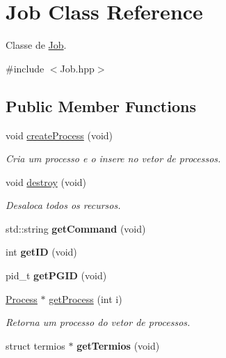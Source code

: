 \hypertarget{classJob}{
\section{Job Class Reference}
\label{classJob}
}


Classe de \hyperlink{classJob}{Job}.  




{\ttfamily \#include $<$Job.hpp$>$}

\subsection*{Public Member Functions}
\begin{DoxyCompactItemize}
\item 
\hypertarget{classJob_a5c8a3cd7594bc9d733b2cc96aa1d3048}{
void \hyperlink{classJob_a5c8a3cd7594bc9d733b2cc96aa1d3048}{createProcess} (void)}
\label{classJob_a5c8a3cd7594bc9d733b2cc96aa1d3048}

\begin{DoxyCompactList}\small\item\em Cria um processo e o insere no vetor de processos. \end{DoxyCompactList}\item 
\hypertarget{classJob_a2db562106fecee581006e4f955170d48}{
void \hyperlink{classJob_a2db562106fecee581006e4f955170d48}{destroy} (void)}
\label{classJob_a2db562106fecee581006e4f955170d48}

\begin{DoxyCompactList}\small\item\em Desaloca todos os recursos. \end{DoxyCompactList}\item 
\hypertarget{classJob_a4d30963a5021100ed0e42999b84d4975}{
std::string {\bfseries getCommand} (void)}
\label{classJob_a4d30963a5021100ed0e42999b84d4975}

\item 
\hypertarget{classJob_a240a158e548e4d5b5801088a9b762aa8}{
int {\bfseries getID} (void)}
\label{classJob_a240a158e548e4d5b5801088a9b762aa8}

\item 
\hypertarget{classJob_a27e1e223f7fa7ab1e8af9b982ac3e7fb}{
pid\_\-t {\bfseries getPGID} (void)}
\label{classJob_a27e1e223f7fa7ab1e8af9b982ac3e7fb}

\item 
\hyperlink{classProcess}{Process} $\ast$ \hyperlink{classJob_a1e03c533c695a6dc59d233eeca764233}{getProcess} (int i)
\begin{DoxyCompactList}\small\item\em Retorna um processo do vetor de processos. \end{DoxyCompactList}\item 
\hypertarget{classJob_a12204776a5d6a7f6cc525de61be9974f}{
struct termios $\ast$ {\bfseries getTermios} (void)}
\label{classJob_a12204776a5d6a7f6cc525de61be9974f}


\end{DoxyCompactItemize}
